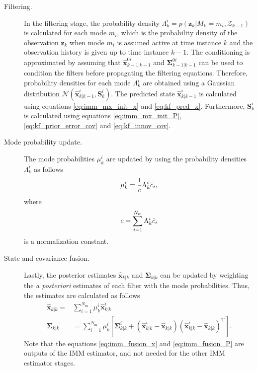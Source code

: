 \documentclass[english, 12pt, a4paper, elec, utf8, a-1b, online]{aaltothesis}
\numberwithin{equation}{section}
\renewcommand{\vec}[1]{\mathbf{#1}}
\newcommand{\xpost}{\hat{\vec{x}}_{k|k}}
\newcommand{\postecov}{\boldsymbol{\Sigma}_{k|k}}
\newcommand{\z}{\vec{z}_k}
\newcommand{\normal}[2]{\mathcal{N}\left(#1, #2 \right)}
\newcommand{\transpose}[1]{#1^\text{T}}
\newcommand{\mxnorm}{ \Bar{c}_i }
\newcommand{\xmxinit}{\hat{\vec{x}}^{0i}_{k-1|k-1}}
\newcommand{\ecovmxinit}{\bm{\Sigma}^{0i}_{k-1|k-1}}
\newcommand{\modexprior}{\hat{\vec{x}}^{i}_{k|k-1}}
\newcommand{\modeinnovcov}{\mathbf{S}^i_{k}}
\newcommand{\modexpost}{\hat{\vec{x}}^{i}_{k|k}}
\newcommand{\modecovpost}{\bm{\Sigma}^i_{k|k}}
\newcommand{\modeobsprob}{\Lambda^i_k}
\def\post{\textit{a posteriori}}
\newcommand{\nmodels}{{N_\text{m}}}
\begin{document}
\begin{description}
\item[Filtering.]

In the filtering stage, the probability density $\modeobsprob = p\left( \z | M_k = m_i, \mathcal{Z}_{k-1} \right) $ is calculated for each mode $m_i$, which is the probability density of the observation $\z$ when mode $m_i$ is assumed active at time instance $k$ and the observation history is given up to time instance $k-1$.
The conditioning is approximated by assuming that $\xmxinit$ and $\ecovmxinit$ can be used to condition the filters before propagating the filtering equations.
Therefore, probability densities for each mode $\modeobsprob$ are obtained using a Gaussian distribution $\normal{\modexprior}{\modeinnovcov}$.
The predicted state $\modexprior$ is calculated using equations \eqref{eq:imm_mx_init_x} and \eqref{eq:kf_pred_x}.
Furthermore,  $\modeinnovcov$ is calculated using equations \eqref{eq:imm_mx_init_P}, \eqref{eq:kf_prior_error_cov} and \eqref{eq:kf_innov_cov}.

\item[Mode probability update.]

The mode probabilities $\mu^i_k$ are updated by using the probability densities $\Lambda_k^i$ as follows
\begin{equation}
    \mu_k^i = \frac{1}{c} \Lambda^i_k \mxnorm,
\end{equation}
where
\begin{equation}
    c = \sum_{i=1}^\nmodels \Lambda_k^i \mxnorm
\end{equation}
is a normalization constant.

\item[State and covariance fusion.]
Lastly, the posterior estimates $\xpost$ and $\postecov$ can be updated by weighting the \post{} estimates of each filter with the mode probabilities.
Thus, the estimates are calculated as follows
\begin{align}\label{eq:imm_fusion_x}
    \xpost =& \sum_{i=1}^\nmodels \mu_k^i \modexpost\\
\label{eq:imm_fusion_P}
    \postecov &= \sum_{i=1}^\nmodels \mu_k^i 
    \left[ 
        \modecovpost + \left( \modexpost - \xpost \right) \transpose{\left( \modexpost - \xpost \right)}
    \right].
\end{align}
Note that the equations \eqref{eq:imm_fusion_x} and \eqref{eq:imm_fusion_P} are outputs of the IMM estimator, and not needed for the other IMM estimator stages.
\end{description}
\end{document}
